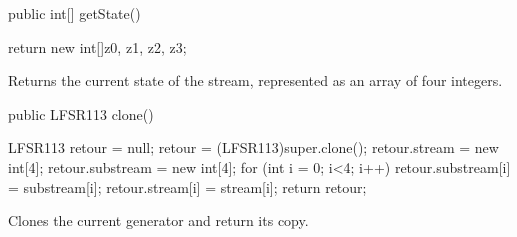 \begin{htmlonly}
\end{htmlonly}
\begin{code}

   public int[] getState() \begin{hide} {
      return new int[]{z0, z1, z2, z3};
   } \end{hide}
\end{code}
\begin{tabb} Returns the current state of the stream, represented as
  an array of four integers.
\end{tabb}
\begin{htmlonly}
\end{htmlonly}
\begin{code}

   public LFSR113 clone() \begin{hide} {
      LFSR113 retour = null;
      retour = (LFSR113)super.clone();
      retour.stream = new int[4];
      retour.substream = new int[4];
      for (int i = 0; i<4; i++) {
         retour.substream[i] = substream[i];
         retour.stream[i] = stream[i];
      }
      return retour;
   }\end{hide}
\end{code}
 \begin{tabb} Clones the current generator and return its copy.
 \end{tabb}
 \begin{htmlonly}
\end{htmlonly}
